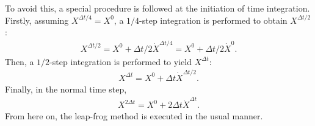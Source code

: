 To avoid this, a special procedure is followed at the initiation of time integration.
Firstly, assuming \(X^{\Delta t/4} = X^0\), a \(1/4\)-step integration is performed to obtain $X^{\Delta t/2}$:
\begin{eqnarray}
  X^{\Delta t/2} = X^0 + \Delta t/2 \dot{X}^{\Delta t/4}
                 = X^0 + \Delta t/2 \dot{X}^0.
\end{eqnarray}
Then, a \(1/2\)-step integration is performed to yield $X^{\Delta t}$:
\begin{eqnarray}
  X^{\Delta t}   = X^0 + \Delta t \dot{X}^{\Delta t/2}.
\end{eqnarray}
Finally, in the normal time step,
\begin{eqnarray}
  X^{2\Delta t}   = X^0 + 2 \Delta t \dot{X}^{\Delta t}.
\end{eqnarray}
From here on, the leap-frog method is executed in the usual manner.
